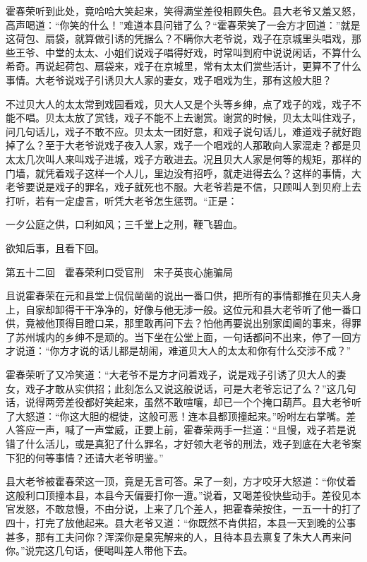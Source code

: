 \documentclass[12pt,UTF8]{ctexbook}
\begin{document}
{{{霍春荣听到此处，竟哈哈大笑起来，笑得满堂差役相顾失色。县大老爷又羞又怒，高声喝道：“你笑的什么！”难道本县问错了么？“霍春荣笑了一会方才回道：”就是这荷包、扇袋，就算做引诱的凭据么？不瞒你大老爷说，戏子在京城里头唱戏，那些王爷、中堂的太太、小姐们说戏子唱得好戏，时常叫到府中说说闲话，不算什么希奇。再说起荷包、扇袋来，戏子在京城里，常有太太们赏些活计，更算不了什么事情。大老爷说戏子引诱贝大人家的妻女，戏子唱戏为生，那有这般大胆？

不过贝大人的太太常到戏园看戏，贝大人又是个头等乡绅，点了戏子的戏，戏子不能不唱。贝太太放了赏钱，戏子不能不上去谢赏。谢赏的时候，贝太太叫住戏子，问几句话儿，戏子不敢不应。贝太太一团好意，和戏子说句话儿，难道戏子就好跑掉了么？至于大老爷说戏子夜入人家，戏子一个唱戏的人那敢向人家混走？都是贝太太几次叫人来叫戏子进城，戏子方敢进去。况且贝大人家是何等的规矩，那样的门墙，就凭着戏子这样一个人儿，里边没有招呼，就走进得去么？这样的事情，大老爷要说是戏子的罪名，戏子就死也不服。大老爷若是不信，只顾叫人到贝府上去打听，若有一定虚言，听凭大老爷怎生惩罚。“正是：

一夕公庭之供，口利如风；三千堂上之刑，鞭飞碧血。

欲知后事，且看下回。





第五十二回　霍春荣利口受官刑　宋子英丧心施骗局





且说霍春荣在元和县堂上侃侃凿凿的说出一番口供，把所有的事情都推在贝夫人身上，自家却卸得干干净净的，好像与他无涉一般。这位元和县大老爷听了他一番口供，竟被他顶得目瞪口呆，那里敢再问下去？怕他再要说出别家闺阃的事来，得罪了苏州城内的乡绅不是顽的。当下坐在公堂上面，一句话都问不出来，停了一回方才说道：“你方才说的话儿都是胡闹，难道贝大人的太太和你有什么交涉不成？”

霍春荣听了又冷笑道：“大老爷不是方才问着戏子，说是戏子引诱了贝大人的妻女，戏子才敢从实供招；此刻怎么又说这般说话，可是大老爷忘记了么？”这几句话，说得两旁差役都好笑起来，虽然不敢喧嚷，却已一个个掩口葫芦。县大老爷听了大怒道：“你这大胆的棍徒，这般可恶！连本县都顶撞起来。”吩咐左右掌嘴。差人答应一声，喊了一声堂威，正要上前，霍春荣两手一拦道：“且慢，戏子若是说错了什么活儿，或是真犯了什么罪名，才好领大老爷的刑法，戏子到底在大老爷案下犯的何等事情？还请大老爷明鉴。”

县大老爷被霍春荣这一顶，竟是无言可答。呆了一刻，方才咬牙大怒道：“你仗着这般利口顶撞本县，本县今天偏要打你一遭。”说着，又喝差役快些动手。差役见本官发怒，不敢怠慢，不由分说，上来了几个差人，把霍春荣按住，一五一十的打了四十，打完了放他起来。县大老爷又道：“你既然不肯供招，本县一天到晚的公事甚多，那有工夫问你？浑深你是臬宪解来的人，且待本县去禀复了朱大人再来问你。”说完这几句话，便喝叫差人带他下去。

}}}
\end{document}
